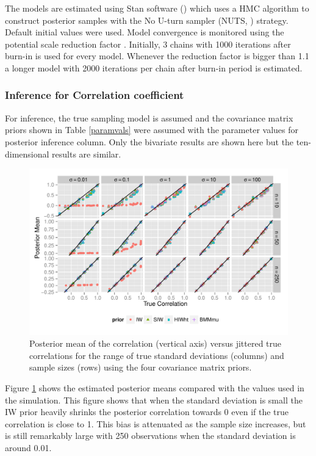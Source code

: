 \documentclass[12pt]{article}
\begin{document}
The models are estimated using Stan software (\cite{stan2014}) which uses a HMC algorithm to construct posterior samples with the No U-turn sampler (NUTS, \cite{hoffman2011no}) strategy. Default initial values were used. Model convergence is monitored using the potential scale reduction factor \citep{bda2003}.
Initially, 3 chains with 1000 iterations after burn-in is used for every model. Whenever the reduction factor is bigger than 1.1 a longer model with 2000 iterations per chain after burn-in period is estimated.  

\subsubsection{Inference for Correlation coefficient}

For inference, the true sampling model is assumed and the covariance matrix priors shown in Table \ref{paramvals} were assumed with the parameter values for posterior inference column. Only the bivariate results are shown here but the ten-dimensional results are similar.

\begin{figure}[hbtp]
\centering
\includegraphics[width=\textwidth] {fig_rho_d2} 
\vspace{-.5in}
\caption{Posterior mean of the correlation (vertical axis) versus jittered true correlations for the range of true standard deviations (columns) and sample sizes (rows) using the four covariance matrix priors.}
\label{rhod2}
\end{figure}

Figure \ref{rhod2} shows the estimated posterior means compared with the values used in the simulation. This figure shows that when the standard deviation is small the IW prior heavily shrinks the posterior correlation towards 0 even if the true correlation is close to 1. This bias is attenuated as the sample size increases, but is still remarkably large with 250 observations when the standard deviation is around 0.01. 
\end{document}
